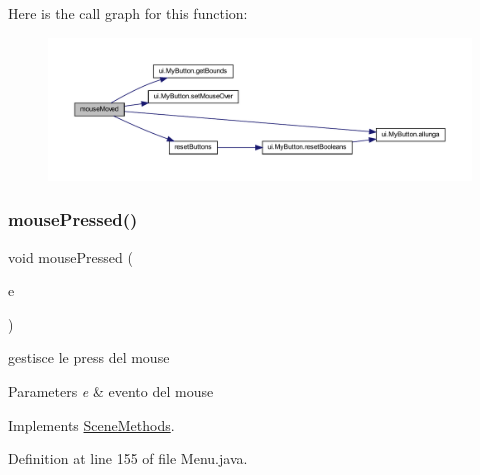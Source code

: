 Here is the call graph for this function\+:\nopagebreak
\begin{figure}[H]
\begin{center}
\leavevmode
\includegraphics[width=350pt]{classscenes_1_1_menu_a2ca251710b65639ec80bc141edde60aa_cgraph}
\end{center}
\end{figure}
\mbox{\label{classscenes_1_1_menu_aed82e1ce3dd3cf283d508c3ba3be70ef}} 
\subsubsection{\texorpdfstring{mouse\+Pressed()}{mousePressed()}}
{\footnotesize\ttfamily void mouse\+Pressed (\begin{DoxyParamCaption}\item[{Mouse\+Event}]{e }\end{DoxyParamCaption})}



gestisce le press del mouse 


\begin{DoxyParams}{Parameters}
{\em e} & evento del mouse \\
\hline
\end{DoxyParams}


Implements \hyperlink{interfacescenes_1_1_scene_methods_aed82e1ce3dd3cf283d508c3ba3be70ef}{Scene\+Methods}.



Definition at line 155 of file Menu.\+java.

